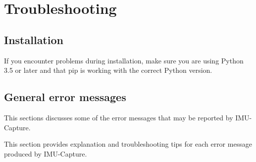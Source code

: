 \documentclass[11pt,letterpaper,article,oneside]{memoir}
\newcommand{\name}{IMU-Capture}
\begin{document}
\chapter{Troubleshooting}

\section{Installation}

If you encounter problems during installation, make sure you are using Python
3.5 or later and that pip is working with the correct Python version.


\section{General error messages}

This sections discusses some of the error messages that may be reported by
\name{}.


\newcommand{\genericFix}{Try resetting the Arduino.  Make sure that the Arduino
is correctly powered and connected to the PC (Section \ref{sec:wiring}), and
that the correct code is installed on the Arduino (Section
\ref{sec:installarduinocode}).}

This section provides explanation and troubleshooting tips for each error
message produced by \name{}.
\end{document}
